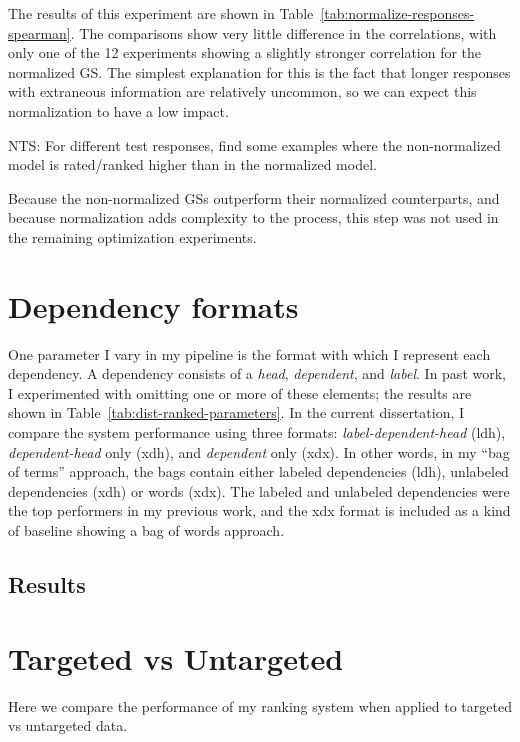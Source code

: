 The results of this experiment are shown in Table~\ref{tab:normalize-responses-spearman}. The comparisons show very little difference in the correlations, with only one of the 12 experiments showing a slightly stronger correlation for the normalized GS. The simplest explanation for this is the fact that longer responses with extraneous information are relatively uncommon, so we can expect this normalization to have a low impact. 

NTS: For different test responses, find some examples where the non-normalized model is rated/ranked higher than in the normalized model.

Because the non-normalized GSs outperform their normalized counterparts, and because normalization adds complexity to the process, this step was not used in the remaining optimization experiments.

\section{Dependency formats}
\label{section:experiment-dependency-formats}
One parameter I vary in my pipeline is the format with which I represent each dependency. A dependency consists of a \textit{head}, \textit{dependent}, and \textit{label}. In past work, I experimented with omitting one or more of these elements; the results are shown in Table~\ref{tab:dist-ranked-parameters}. In the current dissertation, I compare the system performance using three formats: \textit{label-dependent-head} (ldh), \textit{dependent-head} only (xdh), and \textit{dependent} only (xdx). In other words, in my ``bag of terms'' approach, the bags contain either labeled dependencies (ldh), unlabeled dependencies (xdh) or words (xdx). The labeled and unlabeled dependencies were the top performers in my previous work, and the xdx format is included as a kind of baseline showing a bag of words approach.

\subsection{Results}
\label{subsection:dependency-formats-results}

\section{Targeted vs Untargeted}
\label{section:experiment-targeted}
Here we compare the performance of my ranking system when applied to targeted vs untargeted data.
